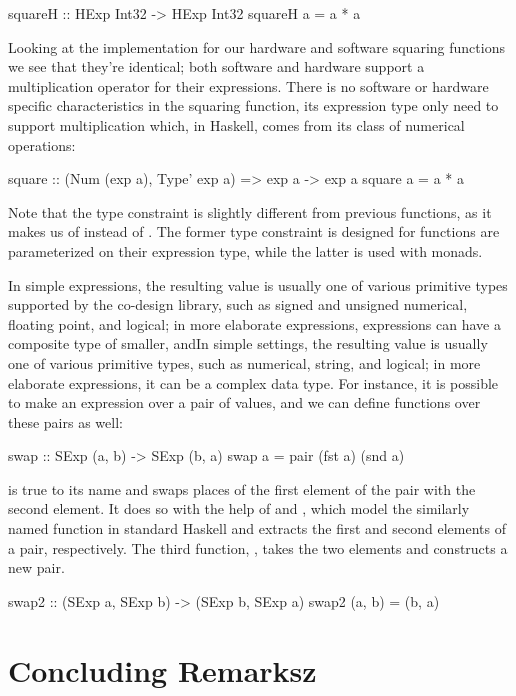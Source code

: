 \begin{stub}
squareH :: HExp Int32 -> HExp Int32
squareH a = a * a
\end{stub}

Looking at the implementation for our hardware and software squaring functions we see that they're identical; both software and hardware support a multiplication operator for their expressions. There is no software or hardware specific characteristics in the squaring function, its expression type only need to support multiplication which, in Haskell, comes from its  class of numerical operations:

\begin{code}
square :: (Num (exp a), Type' exp a) => exp a -> exp a
square a = a * a
\end{code}

\noindent Note that the type constraint is slightly different from previous functions, as it makes us of  instead of . The former type constraint is designed for functions are parameterized on their expression type, while the latter is used with monads.

In simple expressions, the resulting value is usually one of various primitive types supported by the co-design library, such as signed and unsigned numerical, floating point, and logical; in more elaborate expressions, expressions can have a composite type of smaller, andIn simple settings, the resulting value is usually one of various primitive types, such as numerical, string, and logical; in more elaborate expressions, it can be a complex data type. For instance, it is possible to make an expression over a pair of values, and we can define functions over these pairs as well:

\begin{code}
swap :: SExp (a, b) -> SExp (b, a)
swap a = pair (fst a) (snd a)
\end{code}

\noindent {} is true to its name and swaps places of the first element of the pair with the second element. It does so with the help of  and , which model the similarly named function in standard Haskell and extracts the first and second elements of a pair, respectively. The third function, , takes the two elements and constructs a new pair.

\begin{code}
swap2 :: (SExp a, SExp b) -> (SExp b, SExp a)
swap2 (a, b) = (b, a)
\end{code}

\lipsum[1]

%
%

\chapter{Concluding Remarksz}
\label{ch:conc}

\lipsum[1]
